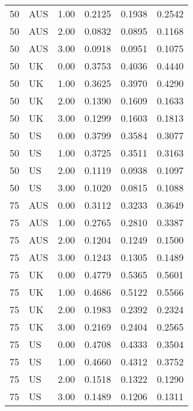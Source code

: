 \begin{table}[ht]
\begin{tabular}{llrlll}
  50 & AUS & 1.00 & 0.2125 & 0.1938 & 0.2542 \\ 
  50 & AUS & 2.00 & 0.0832 & 0.0895 & 0.1168 \\ 
  50 & AUS & 3.00 & 0.0918 & 0.0951 & 0.1075 \\ 
  50 & UK & 0.00 & 0.3753 & 0.4036 & 0.4440 \\ 
  50 & UK & 1.00 & 0.3625 & 0.3970 & 0.4290 \\ 
  50 & UK & 2.00 & 0.1390 & 0.1609 & 0.1633 \\ 
  50 & UK & 3.00 & 0.1299 & 0.1603 & 0.1813 \\ 
  50 & US & 0.00 & 0.3799 & 0.3584 & 0.3077 \\ 
  50 & US & 1.00 & 0.3725 & 0.3511 & 0.3163 \\ 
  50 & US & 2.00 & 0.1119 & 0.0938 & 0.1097 \\ 
  50 & US & 3.00 & 0.1020 & 0.0815 & 0.1088 \\ 
  75 & AUS & 0.00 & 0.3112 & 0.3233 & 0.3649 \\ 
  75 & AUS & 1.00 & 0.2765 & 0.2810 & 0.3387 \\ 
  75 & AUS & 2.00 & 0.1204 & 0.1249 & 0.1500 \\ 
  75 & AUS & 3.00 & 0.1243 & 0.1305 & 0.1489 \\ 
  75 & UK & 0.00 & 0.4779 & 0.5365 & 0.5601 \\ 
  75 & UK & 1.00 & 0.4686 & 0.5122 & 0.5566 \\ 
  75 & UK & 2.00 & 0.1983 & 0.2392 & 0.2324 \\ 
  75 & UK & 3.00 & 0.2169 & 0.2404 & 0.2565 \\ 
  75 & US & 0.00 & 0.4708 & 0.4333 & 0.3504 \\ 
  75 & US & 1.00 & 0.4660 & 0.4312 & 0.3752 \\ 
  75 & US & 2.00 & 0.1518 & 0.1322 & 0.1290 \\ 
  75 & US & 3.00 & 0.1489 & 0.1206 & 0.1311 \\ 
   \hline
\end{tabular}
\end{table}

